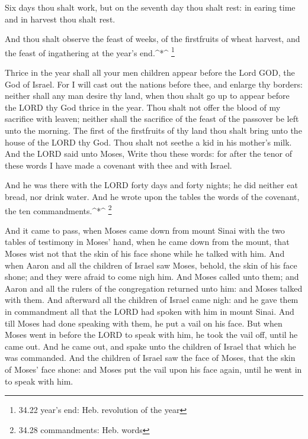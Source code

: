  Six days thou shalt work, but on the seventh day thou
shalt rest: in earing time and in harvest thou shalt rest.

 And thou shalt observe the feast of weeks, of the
firstfruits of wheat harvest, and the feast of ingathering at the year's
end.\^{}*\^{} \footnote{34.22 year's end: Heb. revolution of the year}

 Thrice in the year shall all your men children appear
before the Lord GOD, the God of Israel.  For I will cast
out the nations before thee, and enlarge thy borders: neither shall any
man desire thy land, when thou shalt go up to appear before the LORD thy
God thrice in the year.  Thou shalt not offer the blood of
my sacrifice with leaven; neither shall the sacrifice of the feast of
the passover be left unto the morning.  The first of the
firstfruits of thy land thou shalt bring unto the house of the LORD thy
God. Thou shalt not seethe a kid in his mother's milk.  And
the LORD said unto Moses, Write thou these words: for after the tenor of
these words I have made a covenant with thee and with Israel.

 And he was there with the LORD forty days and forty
nights; he did neither eat bread, nor drink water. And he wrote upon the
tables the words of the covenant, the ten commandments.\^{}*\^{}
\footnote{34.28 commandments: Heb. words}

 And it came to pass, when Moses came down from mount Sinai
with the two tables of testimony in Moses' hand, when he came down from
the mount, that Moses wist not that the skin of his face shone while he
talked with him.  And when Aaron and all the children of
Israel saw Moses, behold, the skin of his face shone; and they were
afraid to come nigh him.  And Moses called unto them; and
Aaron and all the rulers of the congregation returned unto him: and
Moses talked with them.  And afterward all the children of
Israel came nigh: and he gave them in commandment all that the LORD had
spoken with him in mount Sinai.  And till Moses had done
speaking with them, he put a vail on his face.  But when
Moses went in before the LORD to speak with him, he took the vail off,
until he came out. And he came out, and spake unto the children of
Israel that which he was commanded.  And the children of
Israel saw the face of Moses, that the skin of Moses' face shone: and
Moses put the vail upon his face again, until he went in to speak with
him.

